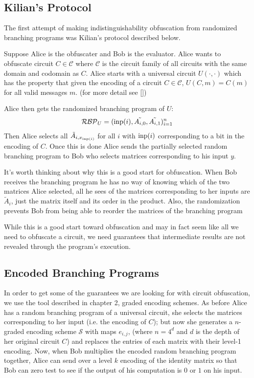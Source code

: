 \documentclass[12pt,twoside]{reedthesis}
\begin{document}
     \subsection{Kilian's Protocol}
     The first attempt of making indistinguishability obfuscation from randomized branching programs was Kilian's protocol described below. 
     \par Suppose Alice is the obfuscater and Bob is the evaluator. Alice wants to obfuscate circuit $C\in \mathcal{C}$ where $\mathcal{C}$ is the circuit family of all circuits with the same domain and codomain as $C$. Alice starts with a universal circuit $U(\cdot, \cdot)$ which has the property that given the encoding of a circuit $C \in \mathcal{C}$, $U(C,m) = C(m)$ for all valid messages $m$. (for more detail see [\cite{Kilian:1988:FCO:62212.62215}])
     \par Alice then gets the randomized branching program of $U$:
     $$\mathcal{RBP}_U = (\text{inp}(i),\tilde{A_{i,0}},\tilde{A_{i,1}})_{i=1}^n$$
     Then Alice selects all $\tilde{A}_{i,x_{\text{inp}(i)}}$ for all $i$ with $\text{inp}(i)$ corresponding to a bit in the encoding of $C$. Once this is done Alice sends the partially selected random branching program to Bob who selects matrices corresponding to his input $y$. 
     \par It's worth thinking about why this is a good start for obfuscation. When Bob receives the branching program he has no way of knowing which of the two matrices Alice selected, all he sees of the matrices corresponding to her inputs are $\tilde{A}_i$, just the matrix itself and its order in the product. Also, the randomization prevents Bob from being able to reorder the matrices of the branching program 
     \par While this is a good start toward obfuscation and may in fact seem like all we need to obfuscate a circuit, we need guarantees that intermediate results are not revealed through the program's execution. 
    
    \subsection{Encoded Branching Programs}
    
    \par In order to get some of the guarantees we are looking for with circuit obfuscation, we use the tool described in chapter 2, graded encoding schemes. As before Alice has a random branching program of a universal circuit, she selects the matrices corresponding to her input (i.e. the encoding of $C$); but now she generates a $n$-graded encoding scheme $\mathcal{S}$ with maps $e_{i,j}$, (where $n= 4^d$ and $d$ is the depth of her original circuit $C$) and replaces the entries of each matrix with their level-1 encoding. Now, when Bob multiplies the encoded random branching program together, Alice can send over a level $k$ encoding of the identity matrix so that Bob can zero test to see if the output of his computation is $0$ or $1$ on his input.
    
\end{document}
